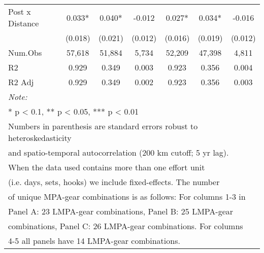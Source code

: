 \begin{table}
\begin{tabular}[t]{lcccccc}
\addlinespace[0.5cm]
\multicolumn{7}{l}{Panel C: 0-600 nautical miles}\\
\hline
\hspace{1em}Post x Distance & 0.033* & 0.040* & -0.012 & 0.027* & 0.034* & -0.016\\
\hspace{1em} & (0.018) & (0.021) & (0.012) & (0.016) & (0.019) & (0.012)\\
\hspace{1em}Num.Obs & 57,618 & 51,884 & 5,734 & 52,209 & 47,398 & 4,811\\
\hspace{1em}R2 & 0.929 & 0.349 & 0.003 & 0.923 & 0.356 & 0.004\\
\hspace{1em}R2 Adj & 0.929 & 0.349 & 0.002 & 0.923 & 0.356 & 0.003\\
\bottomrule
\multicolumn{7}{l}{\rule{0pt}{1em}\textit{Note: }}\\
\multicolumn{7}{l}{\rule{0pt}{1em}* p < 0.1, ** p < 0.05, *** p < 0.01}\\
\multicolumn{7}{l}{\rule{0pt}{1em}Numbers in parenthesis are standard errors robust to heteroskedasticity}\\
\multicolumn{7}{l}{\rule{0pt}{1em}and spatio-temporal autocorrelation (200 km cutoff; 5 yr lag).}\\
\multicolumn{7}{l}{\rule{0pt}{1em}When the data used contains more than one effort unit}\\
\multicolumn{7}{l}{\rule{0pt}{1em}(i.e. days, sets, hooks) we include fixed-effects. The number}\\
\multicolumn{7}{l}{\rule{0pt}{1em}of unique MPA-gear combinations is as follows: For columns 1-3 in}\\
\multicolumn{7}{l}{\rule{0pt}{1em}Panel A: 23 LMPA-gear combinations, Panel B: 25 LMPA-gear}\\
\multicolumn{7}{l}{\rule{0pt}{1em}combinations, Panel C: 26 LMPA-gear combinations. For columns}\\
\multicolumn{7}{l}{\rule{0pt}{1em}4-5 all panels have 14 LMPA-gear combinations.}\\
\end{tabular}
\end{table}
